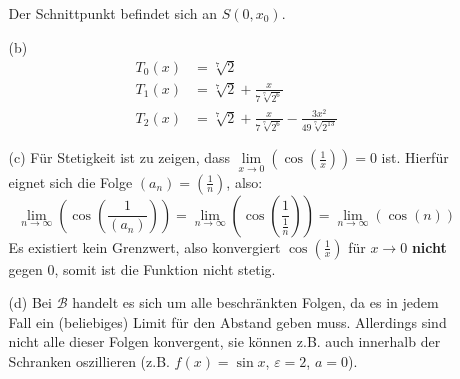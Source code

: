 \documentclass[a4paper,11pt,fleqn]{scrartcl}
\newcommand{\bra}[1]{\left(#1\right)}
\newcommand{\limxn}[2]{\lim\limits_{x \rightarrow #1}\bra{#2}}
\newcommand{\limn}[1]{\lim\limits_{n \rightarrow \infty}\bra{#1}}
\begin{document}
\begin{enumerate}
\begin{enumerate}
                Der Schnittpunkt befindet sich an $S(0, x_0)$.

            \item[(b)]
                \[\begin{array}{ll}
                    T_0(x) &= \sqrt[7]{2} \\[0.5em]
                    T_1(x) &= \sqrt[7]{2} + \frac{x}{7 \sqrt[7]{2^6}} \\[0.5em]
                    T_2(x) &= \sqrt[7]{2} + \frac{x}{7 \sqrt[7]{2^6}} - \frac{3x^2}{49 \sqrt[7]{2^{13}} }
                \end{array}\]

            \item[(c)]
                Für Stetigkeit ist zu zeigen, dass $\limxn{0}{\cos\bra{\frac{1}{x}}} = 0$
                ist. Hierfür eignet sich die Folge $(a_n) = (\frac{1}{n})$, also:
                \[ \limn{\cos\bra{\frac{1}{(a_n)}}} =
                \limn{\cos\bra{\frac{1}{\frac{1}{n}}}} =
                \limn{\cos\bra{n}} \]
                Es existiert kein Grenzwert, also konvergiert $\cos\bra{\frac{1}{x}}$
                für $x \rightarrow 0$ \textbf{nicht} gegen $0$, somit ist die
                Funktion nicht stetig.

            \item[(d)]
                Bei $\mathcal{B}$ handelt es sich um alle beschränkten Folgen, da
                es in jedem Fall ein (beliebiges) Limit für den Abstand geben
                muss. Allerdings sind nicht alle dieser Folgen konvergent, sie
                können z.B. auch innerhalb der Schranken oszillieren (z.B.
                $f(x) = \sin x$, $\varepsilon = 2$, $a = 0$).


\end{enumerate}
\end{enumerate}
\end{document}
